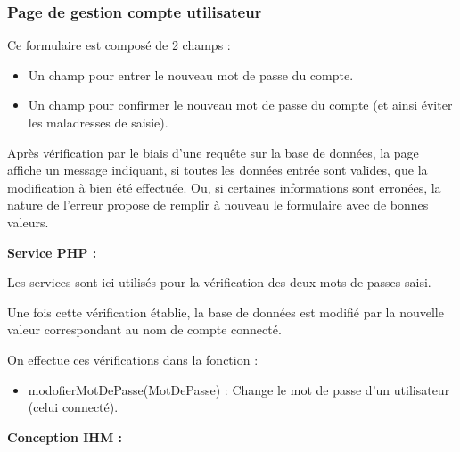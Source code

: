 		\subsubsection{Page de gestion compte utilisateur}

			\begin{paragraphe}
				Ce formulaire est composé de 2 champs :
				\begin{itemize}
					\item Un champ pour entrer le nouveau mot de passe du compte.
					\item Un champ pour confirmer le nouveau mot de passe du compte (et ainsi éviter les maladresses de saisie).
				\end{itemize}
			\end{paragraphe}

			\begin{paragraphe}
				Après vérification par le biais d'une requête sur la base de données, la page affiche un message indiquant, si toutes les données entrée sont valides, que la modification à bien été effectuée. Ou, si certaines informations sont erronées, la nature de l'erreur propose de remplir à nouveau le formulaire avec de bonnes valeurs.
			\end{paragraphe}

			\begin{paragraphe}
				\textbf{Service PHP :}
			\end{paragraphe}

			\begin{paragraphe}
				Les services sont ici utilisés pour la vérification des deux mots de passes saisi.\par
				Une fois cette vérification établie, la base de données est modifié par la nouvelle valeur correspondant au nom de compte connecté. 
			\end{paragraphe}

			\begin{paragraphe}
				On effectue ces vérifications dans la fonction :
				\begin{itemize}
					\item modofierMotDePasse(MotDePasse) : Change le mot de passe d'un utilisateur (celui connecté).
				\end{itemize}
			\end{paragraphe}

			\begin{paragraphe}
				\textbf{Conception IHM :}
			\end{paragraphe}

